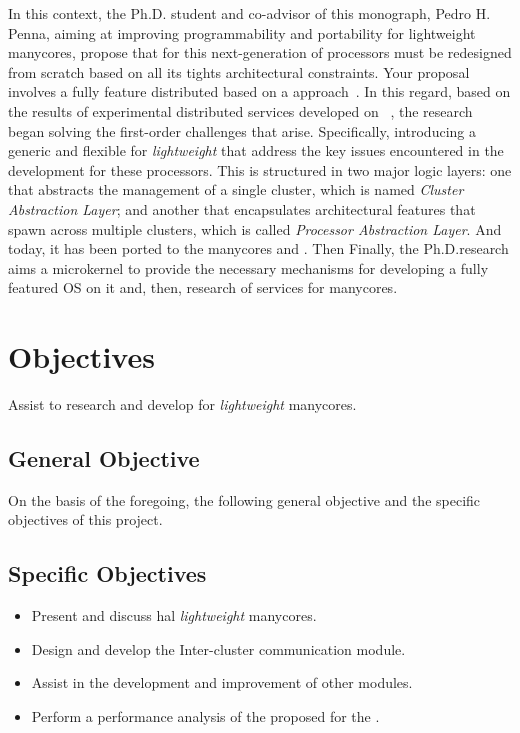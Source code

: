     In this context, the Ph.D. student and co-advisor of this monograph, Pedro H. Penna, aiming at improving programmability and portability for lightweight manycores, propose that \oses for this next-generation of processors must be redesigned from scratch based on all its tights architectural constraints.
    Your proposal involves a fully feature distributed \os based on a \multikernel approach~\cite{Baumann2009}.
    In this regard, based on the results of experimental distributed services developed on \mppa~\cite{os:rmem}, the research began solving the first-order challenges that arise.
    Specifically, introducing a generic and flexible \hal for \textit{lightweight} \manycores that address the key issues encountered in the development for these processors. This \hal is structured in two major logic layers: one that abstracts the management of a single cluster, which is named \textit{Cluster Abstraction Layer}; and another that encapsulates architectural features that spawn across multiple clusters, which is called \textit{Processor Abstraction Layer}.
    And today, it has been ported to the manycores \mppa and \optimsoc.
    Then 
    Finally, the Ph.D.research aims a microkernel to provide the necessary mechanisms for developing a fully featured OS on it and, then, research of \multikernel services for manycores.

\section{Objectives}
    Assist to research and develop \hal for \textit{lightweight} manycores.

\subsection{General Objective}
    On the basis of the foregoing, the following general objective and the specific objectives of this project.
    
\subsection{Specific Objectives}
    \begin{itemize}
        \item Present and discuss hal \textit{lightweight} manycores.
        \item Design and develop the Inter-cluster communication module.
        \item Assist in the development and improvement of other modules.
        \item Perform a performance analysis of the proposed \hal for the \mppa.
    \end{itemize}
    
